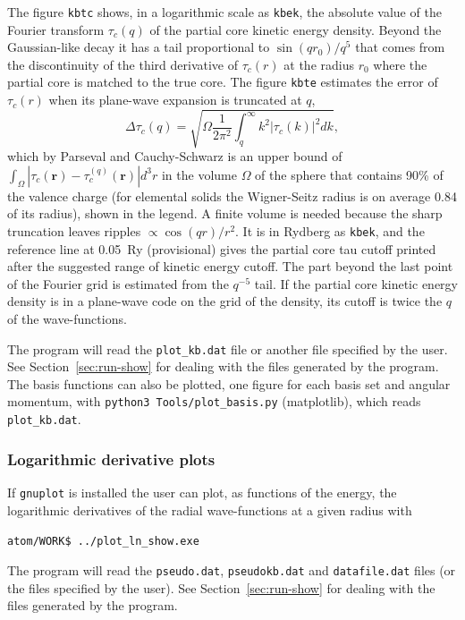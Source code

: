 \documentclass[11pt]{article}
\begin{document}
\label{sec:run-show-kb}
The figure \texttt{kbtc} shows, in a logarithmic scale as \texttt{kbek}, the absolute value of the Fourier transform
$\tau_c(q)$ of the partial core kinetic energy density.  Beyond the Gaussian-like decay it has a tail
proportional to $\sin(q r_0)/q^5$ that comes from the discontinuity of the third derivative of $\tau_c(r)$ at the
radius $r_0$ where the partial core is matched to the true core.
The figure \texttt{kbte} estimates the error of $\tau_c(r)$ when its plane-wave expansion is truncated at $q$,
\begin{equation}
\Delta \tau_c(q) = \sqrt{ \Omega \frac{1}{2 \pi^2} \int_q^\infty k^2 |\tau_c(k)|^2 dk },
\end{equation}
which by Parseval and Cauchy-Schwarz is an upper bound of $\int_\Omega |\tau_c(\mathbf{r}) - \tau_c^{(q)}(\mathbf{r})| d^3r$
in the volume $\Omega$ of the sphere that contains 90\% of the valence charge
(for elemental solids the Wigner-Seitz radius is on average 0.84 of its radius), shown in the legend.
A finite volume is needed because the sharp truncation leaves ripples $\propto \cos(qr)/r^2$.
It is in Rydberg as \texttt{kbek}, and the reference line at 0.05~Ry (provisional) gives the
partial core tau cutoff printed after the suggested range of kinetic energy cutoff.  The part beyond the last point
of the Fourier grid is estimated from the $q^{-5}$ tail.  If the partial core kinetic energy
density is in a plane-wave code on the grid of the density, its cutoff is twice the $q$ of the wave-functions.

The program will read the \texttt{plot{\_}kb.dat} file or another file specified by the user.
See Section~\ref{sec:run-show} for dealing with the files generated by the program.
The basis functions can also be plotted, one figure for each basis set and angular momentum,
with \texttt{python3 Tools/plot\_basis.py} (matplotlib), which reads \texttt{plot{\_}kb.dat}.


\subsubsection{Logarithmic derivative plots}
\label{sec:run-show-ln}

If \texttt{gnuplot} is installed the user can plot, as functions of the energy,
the logarithmic derivatives of the radial wave-functions at a given radius with

\noindent\texttt{atom/WORK\$ ../plot{\_}ln{\_}show.exe}

The program will read the \texttt{pseudo.dat}, \texttt{pseudokb.dat} and \texttt{datafile.dat} files (or the files specified
by the user).  See Section~\ref{sec:run-show} for dealing with the files generated by the program.
\end{document}
